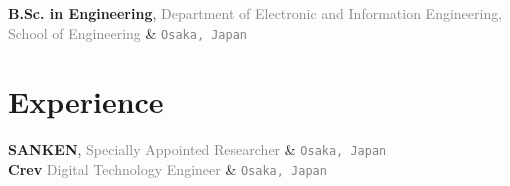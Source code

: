 \documentclass[9pt,a4paper]{article}
\begin{document}
\begin{EntriesTableRight}
  \textbf{B.Sc.\! in Engineering}, \OU
  \vspace{-0.1em}
  \newline
  \textcolor{gray}{{\fontsize{9pt}{0}\selectfont Department of Electronic and Information Engineering, School of Engineering}}
  \vspace{-0.1em}
  \newline
  \setlength{\leftmargini}{17.2pt}
  &
  \hfill
  \vspace{0.5em}
  \newline
  \hfill
  \textcolor{gray}{\fontsize{9pt}{0}\selectfont \texttt{Osaka, \!\!Japan}~}
\end{EntriesTableRight}

\section{Experience}

\begin{EntriesTableRight}
  \textbf{SANKEN}, \OU
  \vspace{-0.1em}
  \newline
  \textcolor{gray}{\fontsize{9pt}{0}\selectfont Specially Appointed Researcher}
  &
  \hfill {}
  \vspace{0.25em}
  \newline
  \hfill \textcolor{gray}{\fontsize{9pt}{0}\selectfont \texttt{Osaka, \!\!Japan}~}
  \newline
  \\

  \textbf{Crev}
  \vspace{-0.1em}
  \newline
  \textcolor{gray}{\fontsize{9pt}{0}\selectfont Digital Technology Engineer}
  &
  \hfill {}
  \vspace{0.45em}
  \newline
  \hfill \textcolor{gray}{\fontsize{9pt}{0}\selectfont \texttt{Osaka, \!\!Japan}~}
\end{EntriesTableRight}
\end{document}
